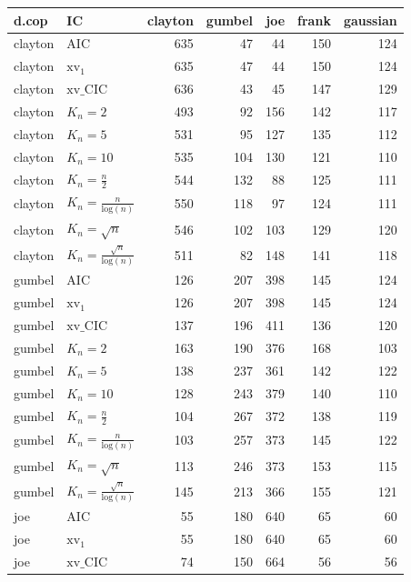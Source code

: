 \begin{table}[htbp]
\centering
\begin{tabular}{llrrrrr}
  \hline
d.cop & IC & clayton & gumbel & joe & frank & gaussian \\ 
  \hline
clayton & AIC & 635 & 47 & 44 & 150 & 124 \\ 
  clayton & $\text{xv}_{1}$ & 635 & 47 & 44 & 150 & 124 \\ 
  clayton & $\text{xv}\_\text{CIC}$ & 636 & 43 & 45 & 147 & 129 \\ 
  clayton & $K_{n}=2$ & 493 & 92 & 156 & 142 & 117 \\ 
  clayton & $K_{n}=5$ & 531 & 95 & 127 & 135 & 112 \\ 
  clayton & $K_{n}=10$ & 535 & 104 & 130 & 121 & 110 \\ 
  clayton & $K_{n}=\tfrac{n}{2}$ & 544 & 132 & 88 & 125 & 111 \\ 
  clayton & $K_{n}=\tfrac{n}{\text{log}(n)}$ & 550 & 118 & 97 & 124 & 111 \\ 
  clayton & $K_{n}=\sqrt{n}$ & 546 & 102 & 103 & 129 & 120 \\ 
  clayton & $K_{n}=\tfrac{\sqrt{n}}{\text{log}(n)}$ & 511 & 82 & 148 & 141 & 118 \\ 
   \hdashline
gumbel & AIC & 126 & 207 & 398 & 145 & 124 \\ 
  gumbel & $\text{xv}_{1}$ & 126 & 207 & 398 & 145 & 124 \\ 
  gumbel & $\text{xv}\_\text{CIC}$ & 137 & 196 & 411 & 136 & 120 \\ 
  gumbel & $K_{n}=2$ & 163 & 190 & 376 & 168 & 103 \\ 
  gumbel & $K_{n}=5$ & 138 & 237 & 361 & 142 & 122 \\ 
  gumbel & $K_{n}=10$ & 128 & 243 & 379 & 140 & 110 \\ 
  gumbel & $K_{n}=\tfrac{n}{2}$ & 104 & 267 & 372 & 138 & 119 \\ 
  gumbel & $K_{n}=\tfrac{n}{\text{log}(n)}$ & 103 & 257 & 373 & 145 & 122 \\ 
  gumbel & $K_{n}=\sqrt{n}$ & 113 & 246 & 373 & 153 & 115 \\ 
  gumbel & $K_{n}=\tfrac{\sqrt{n}}{\text{log}(n)}$ & 145 & 213 & 366 & 155 & 121 \\ 
   \hdashline
joe & AIC & 55 & 180 & 640 & 65 & 60 \\ 
  joe & $\text{xv}_{1}$ & 55 & 180 & 640 & 65 & 60 \\ 
  joe & $\text{xv}\_\text{CIC}$ & 74 & 150 & 664 & 56 & 56 \\ 

\end{tabular}
\end{table}
